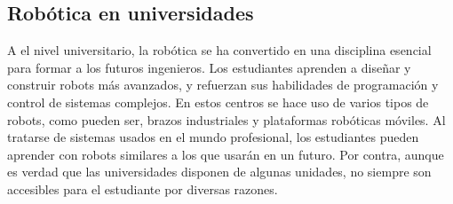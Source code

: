 \newpage
\subsection{Robótica en universidades}
A el nivel universitario, la robótica se ha convertido en una disciplina esencial para formar a los futuros ingenieros. Los estudiantes aprenden 
a diseñar y construir robots más avanzados, y refuerzan sus habilidades de programación y control de sistemas complejos. En estos centros 
se hace uso de varios tipos de robots, como pueden ser, brazos industriales y plataformas robóticas móviles. Al tratarse de sistemas 
usados en el mundo profesional, los estudiantes pueden aprender con robots similares a los que usarán en un futuro. Por contra, aunque es verdad 
que las universidades disponen de algunas unidades, no siempre son accesibles para el estudiante por diversas razones.
